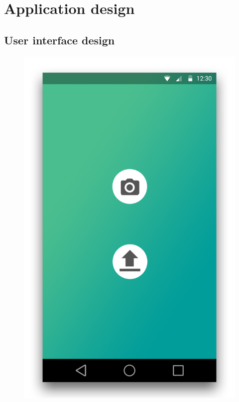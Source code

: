 \documentclass[11pt, a4paper]{report}
\begin{document}
\chapter{Application design}



\section{User interface design}

\begin{figure}[h]
\centering
\begin{minipage}[b]{0.2\linewidth}
	\centering
	\includegraphics[totalheight=6cm]{img/03.png}

\end{minipage}
\end{figure}
\end{document}
